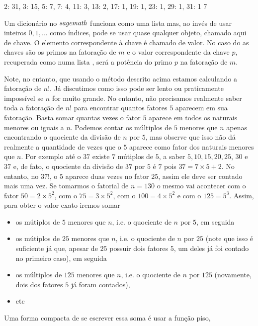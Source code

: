 \begin{sageoutput}
{2: 31, 3: 15, 5: 7, 7: 4, 11: 3, 13: 2, 17: 1, 19: 1, 23: 1, 29: 1, 31: 1}
7
\end{sageoutput}
Um dicionário no $\emph{sagemath}$ funciona como uma lista mas, ao invés
de usar inteiros $0, 1, ... $ como índices, pode se usar quase qualquer
objeto, chamado aqui de chave. O elemento correspondente
à chave é chamado de valor. No caso do 
as chaves são os primos na fatoração de $m$ e o
valor correspondente da chave $p$, recuperada como
numa lista , será a potência do primo
$p$ na fatoração de $m$. 

Note, no entanto, que usando o método descrito acima estamos
calculando a fatoração de $n!$. Já discutimos como isso
pode ser lento ou praticamente
impossível se $n$ for muito grande. No entanto, não precisamos
realmente saber toda a fatoração de $n!$ para encontrar
quantos fatores $5$ aparecem em sua fatoração. Basta somar quantas vezes
o fator $5$ aparece em todos os naturais menores ou iguais a $n$.
Podemos contar os múltiplos de $5$ menores que $n$ apenas
encontrando o quociente da divisão de $n$ por $5$, mas 
observe que isso não dá realmente a quantidade de vezes que o
$5$ aparece como fator dos naturais menores que $n$. Por exemplo
até o $37$ existe $7$ mútiplos de $5$, a saber $5, 10, 15, 20, 25$, $30$ e
$37$ e, de fato, o quociente da divisão de $37$ por $5$ é $7$
pois $37 = 7\times 5 + 2$. No entanto, no $37!$, o $5$ aparece
duas vezes no fator $25$, assim ele deve ser contado mais uma vez.
Se tomarmos o fatorial de $n  = 130$ o mesmo vai acontecer com o
fator $50 = 2\times 5^2$, com o $75 = 3\times 5^2$, com o
$100 = 4\times 5^2$ e com o $125 = 5^3$. 
Assim, para obter o valor exato iremos somar
\begin{itemize}
  \item os mútiplos de $5$ menores que $n$, i.e. o
  quociente de $n$ por $5$, em seguida
  \item os mútiplos de $25$ menores que $n$, i.e. o quociente de $n$ por $25$
  (note que isso é suficiente já que, apesar de $25$ possuir dois
  fatores $5$, um deles já foi contado no primeiro caso), em seguida
  \item os múltiplos de $125$ menores que $n$, i.e. o
  quociente de $n$ por $125$ (novamente, dois dos fatores $5$ já foram
  contados),
  \item etc
\end{itemize}
Uma forma compacta de se escrever essa soma é usar a função piso,
